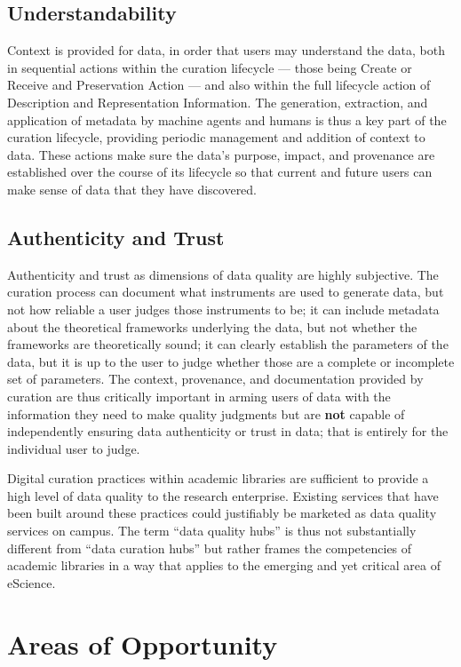 \documentclass[12pt,letterpaper,titlepage,onecolumn,biblatex,backend=biber,style=chicago-authordate]{article}
\begin{document}
\subsection{Understandability}

Context is provided for data, in order that users may understand the
data, both in sequential actions within the curation lifecycle ---
those being Create or Receive and Preservation Action --- and also
within the full lifecycle action of Description and Representation
Information. The generation, extraction, and application of metadata
by machine agents and humans is thus a key part of the curation
lifecycle, providing periodic management and addition of context to
data.  These actions make sure the data's purpose, impact, and
provenance are established over the course of its lifecycle so that
current and future users can make sense of data that they have
discovered.

\subsection{Authenticity and Trust}

Authenticity and trust as dimensions of data quality are highly
subjective.  The curation process can document what instruments are
used to generate data, but not how reliable a user judges those
instruments to be; it can include metadata about the theoretical
frameworks underlying the data, but not whether the frameworks are
theoretically sound; it can clearly establish the parameters of the
data, but it is up to the user to judge whether those are a complete
or incomplete set of parameters. The context, provenance, and
documentation provided by curation are thus critically important in
arming users of data with the information they need to make quality
judgments but are \textbf{not} capable of independently ensuring data
authenticity or trust in data; that is entirely for the individual
user to judge.

Digital curation practices within academic libraries are sufficient to
provide a high level of data quality to the research
enterprise. Existing services that have been built around these
practices could justifiably be marketed as data quality services on
campus. The term ``data quality hubs'' is thus not substantially
different from ``data curation hubs'' but rather frames the
competencies of academic libraries in a way that applies to the
emerging and yet critical area of eScience.

\section{Areas of Opportunity}
\end{document}
